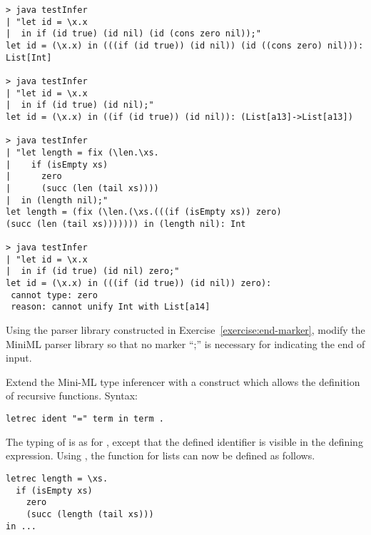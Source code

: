 \begin{itemize}
{\begin{lstlisting}
> java testInfer 
| "let id = \x.x  
|  in if (id true) (id nil) (id (cons zero nil));"
let id = (\x.x) in (((if (id true)) (id nil)) (id ((cons zero) nil))): List[Int]

> java testInfer
| "let id = \x.x 
|  in if (id true) (id nil);"
let id = (\x.x) in ((if (id true)) (id nil)): (List[a13]->List[a13])

> java testInfer
| "let length = fix (\len.\xs.
|    if (isEmpty xs) 
|      zero 
|      (succ (len (tail xs))))
|  in (length nil);"
let length = (fix (\len.(\xs.(((if (isEmpty xs)) zero) 
(succ (len (tail xs))))))) in (length nil): Int

> java testInfer 
| "let id = \x.x 
|  in if (id true) (id nil) zero;"
let id = (\x.x) in (((if (id true)) (id nil)) zero): 
 cannot type: zero
 reason: cannot unify Int with List[a14]
\end{lstlisting}

\begin{exercise}\label{exercise:hm-parse} Using the parser library constructed in
Exercise~\ref{exercise:end-marker}, modify the MiniML parser library
so that no marker ``;'' is necessary for indicating the end of input.
\end{exercise}
}

\begin{exercise}\label{execcise:hm-extend} Extend the Mini-ML  type
inferencer with a  construct which allows the definition of
recursive functions. Syntax:
\begin{lstlisting}
letrec ident "=" term in term .
\end{lstlisting}
The typing of  is as for , 
except that the defined identifier is visible in the defining expression. Using , the  function for lists can now be defined as follows.
\begin{lstlisting}
letrec length = \xs.
  if (isEmpty xs)
    zero
    (succ (length (tail xs)))
in ...
\end{lstlisting}
\end{exercise}




\end{itemize}
